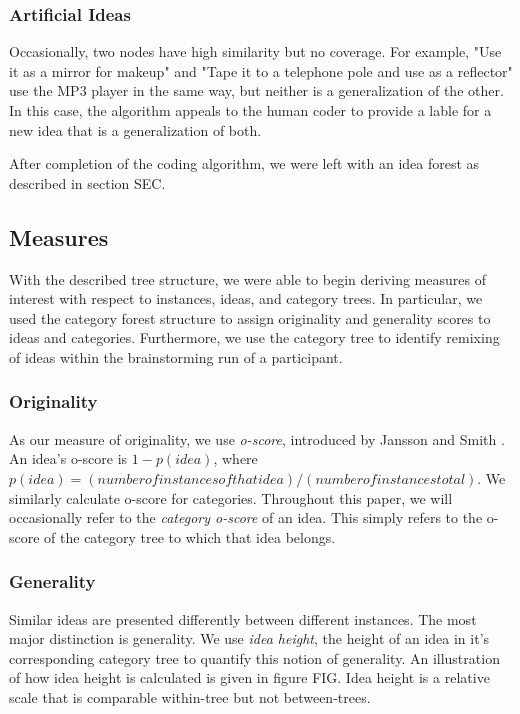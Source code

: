 \subsubsection{Artificial Ideas}
Occasionally, two nodes have high similarity but no coverage. For example, "Use it as a mirror for makeup" and "Tape it to a telephone pole and use as a reflector" use the MP3 player in the same way, but neither is a generalization of the other. In this case, the algorithm appeals to the human coder to provide a lable for a new idea that is a generalization of both.

After completion of the coding algorithm, we were left with an idea forest as described in section SEC.

\subsection{Measures}

With the described tree structure, we were able to begin deriving measures of interest with respect to instances, ideas, and category trees. In particular, we used the category forest structure to assign originality and generality scores to ideas and categories. Furthermore, we use the category tree to identify remixing of ideas within the brainstorming run of a participant.

\subsubsection{Originality}

As our measure of originality, we use \emph{o-score}, introduced by Jansson and Smith \cite{jansson_design_1991}. An idea's o-score is $1 - p(idea)$, where $p(idea) = (number of instances of that idea)/(number of instances total)$. We similarly calculate o-score for categories. Throughout this paper, we will occasionally refer to the \emph{category o-score} of an idea. This simply refers to the o-score of the category tree to which that idea belongs.

\subsubsection{Generality}

Similar ideas are presented differently between different instances. The most major distinction is generality. We use \emph{idea height}, the height of an idea in it's corresponding category tree to quantify this notion of generality. An illustration of how idea height is calculated is given in figure FIG. Idea height is a relative scale that is comparable within-tree but not between-trees.

